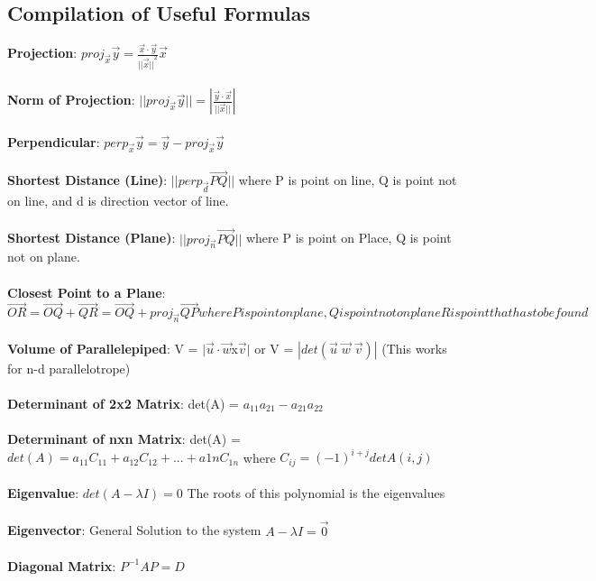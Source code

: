 \documentclass[12pt]{article}
\newcommand{\vectorproj}[2][]{\textit{proj}_{\vec{#1}}\vec{#2}}
\newcommand{\vectorperp}[2][]{\textit{perp}_{\vec{#1}}\vec{#2}}
\begin{document}
\newpage
\begin{appendices}
\appendix 
\section{Compilation of Useful Formulas}
\label{appendix:Formula}
\noindent
\textbf{Projection}: $\vectorproj[x]{y} = \frac{\vec{x}\cdot\vec{y}}{{||\vec{x}||}^2}\vec{x}$\\\\
\noindent
\textbf{Norm of Projection}: $||\vectorproj[x]{y}|| = |\frac{\vec{y}\cdot\vec{x}}{||\vec{x}||}|$\\\\
\noindent
\textbf{Perpendicular}: $\vectorperp[x]{y} = \vec{y} - \vectorproj[x]{y}$\\\\
\noindent
\textbf{Shortest Distance (Line)}: $||\vectorperp[d]{{PQ}}||$ where P is point on line, Q is point not on line, and d is direction vector of line.\\\\
\noindent
\textbf{Shortest Distance (Plane)}: $||\vectorproj[n]{{PQ}}||$ where P is point on Place, Q is point not on plane.\\\\
\noindent
\textbf{Closest Point to a Plane}: $\vec{OR} = \vec{OQ} + \vec{QR} = \vec{OQ} + \vectorproj[n]{QP} where P is point on plane, Q is point not on plane R is point that has to be found$\\\\
\noindent
\textbf{Volume of Parallelepiped}: V = $|\vec{u}\cdot\vec{w}$x$\vec{v}|$
or V = $|det(\vec{u}\;\vec{w}\; \vec{v})|$ (This works for n-d parallelotrope)\\\\
\noindent
\textbf{Determinant of 2x2 Matrix}: det(A) = $a_{11}a_{21} - a_{21}a_{22}$\\\\
\noindent
\textbf{Determinant of nxn Matrix}: det(A) = $det(A) = a_{11}C_{11} + a_{12}C_{12}+...+a{1n}C_{1n}$ where $C_{ij} = (-1)^{i+j}detA(i,j)$\\\\
\noindent
\textbf{Eigenvalue}: $det(A-\lambda I) = 0$ The roots of this polynomial is the eigenvalues\\\\
\noindent
\textbf{Eigenvector}: General Solution to the system $A-\lambda I = \vec{0}$\\\\
\noindent
\textbf{Diagonal Matrix}: $P^{-1}AP = D$\\\\

\end{appendices}
\end{document}
